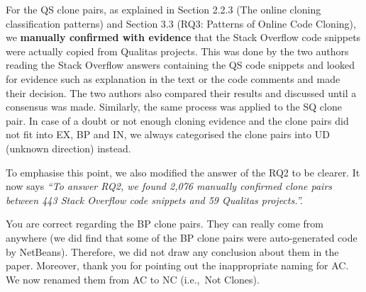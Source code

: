 \documentclass[a4paper,twoside,10pt]{reviewresponse}
\begin{document}
For the QS clone pairs, as explained in Section 2.2.3 (The online cloning
classification patterns) and Section 3.3 (RQ3: Patterns of Online Code Cloning),
we \textbf{manually confirmed with evidence} that the Stack Overflow code
snippets were actually copied from Qualitas projects. This was done by the two
authors reading the Stack Overflow answers containing the QS code snippets and
looked for evidence such as explanation in the text or the code comments and
made their decision. The two authors also compared their results and discussed
until a consensus was made. Similarly, the same process was applied to the SQ
clone pair. %
In case of a doubt or not enough cloning evidence and the clone pairs did not
fit into EX, BP and IN, we always categorised the clone pairs into UD (unknown
direction) instead.

To emphasise this point, we also modified the answer of the RQ2 to be clearer.
It now says \textit{``To answer RQ2, we found 2,076 manually confirmed clone
	pairs between 443 Stack Overflow code snippets and 59 Qualitas projects.''.}


You are correct regarding the BP clone pairs. They can really come from anywhere
(we did find that some of the BP clone pairs were auto-generated code by
NetBeans). Therefore, we did not draw any conclusion about them in the paper.
Moreover, thank you for pointing out the inappropriate naming for AC. We now
renamed them from AC to NC (i.e.,~Not Clones).
\end{document}
